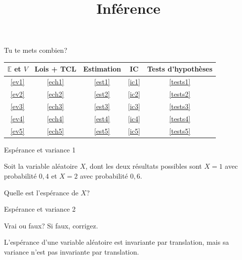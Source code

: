 \documentclass{BeamerTemplate}
\title{Inférence}
\date{}
\begin{document}
\begin{frame}

\titlepage

\end{frame}

\begin{frame}{Tu te mets combien?}
 \begin{table}[h!]
    \centering
    \renewcommand{\arraystretch}{1.4}
    \begin{tabular}{c|c|c|c|c}
        \textbf{$\mathbb{E}$ et $V$} & 
        \textbf{Lois + TCL} & 
        \textbf{Estimation} & 
        \textbf{IC} & 
        \textbf{Tests d'hypothèses} \\ \hline
        \href{Niveau 1}{\ref{ev1}} & \href{Niveau 1}{\ref{ech1}} & \href{Niveau 1}{\ref{est1}} & \href{Niveau 1}{\ref{ic1}} & \href{Niveau 1}{\ref{tests1}} \\
        \href{Niveau 2}{\ref{ev2}} & \href{Niveau 2}{\ref{ech2}} & \href{Niveau 2}{\ref{est2}} & \href{Niveau 2}{\ref{ic2}} & \href{Niveau 2}{\ref{tests2}} \\
        \href{Niveau 3}{\ref{ev3}} & \href{Niveau 3}{\ref{ech3}} & \href{Niveau 3}{\ref{est3}} & \href{Niveau 3}{\ref{ic3}} & \href{Niveau 3}{\ref{tests3}} \\
        \href{Niveau 4}{\ref{ev4}} & \href{Niveau 4}{\ref{ech4}} & \href{Niveau 4}{\ref{est4}} & \href{Niveau 4}{\ref{ic4}} & \href{Niveau 4}{\ref{tests4}} \\
        \href{Niveau 5}{\ref{ev5}} & \href{Niveau 5}{\ref{ech5}} & \href{Niveau 5}{\ref{est5}} & \href{Niveau 5}{\ref{ic5}} & \href{Niveau 5}{\ref{tests5}} \\
    \end{tabular}
    \label{tab:niveaux}
\end{table}
\end{frame}

\begin{frame}{Espérance et variance 1}\label{ev1}
\begin{center}
        Soit la variable aléatoire $X$, dont les deux résultats possibles sont $X=1$ avec probabilité $0,4$ et $X=2$ avec probabilité $0,6$. 

    \medskip
    Quelle est l'espérance de $X$?
\end{center}

\end{frame}


\begin{frame}{Espérance et variance 2}\label{ev2}
\begin{center}
        Vrai ou faux? Si faux, corrigez.
\medskip

L'espérance d'une variable aléatoire est invariante par translation, mais sa variance n'est pas invariante par translation.
\end{center}

\end{frame}
\end{document}
